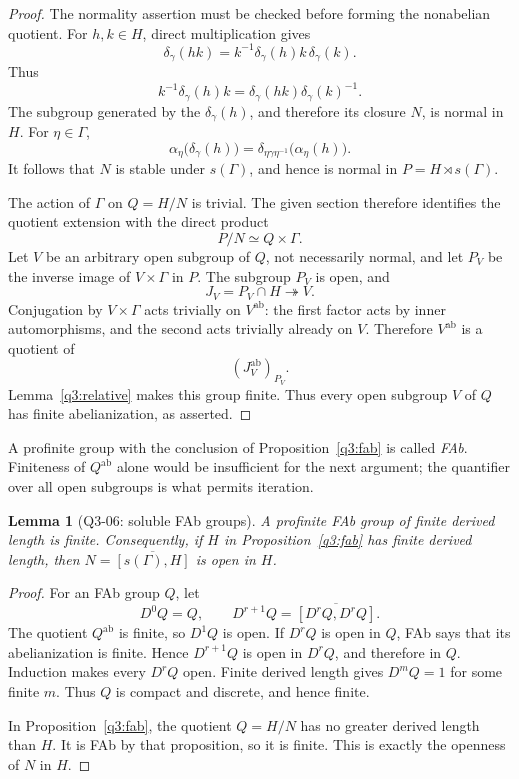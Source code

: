\documentclass[11pt,a4paper]{article}
\newtheorem{lemma}[theorem]{Lemma}
\theoremstyle{remark}
\begin{document}
\begin{proof}
The normality assertion must be checked before forming the
nonabelian quotient.  For \(h,k\in H\), direct multiplication gives
\[
\delta_\gamma(hk)
=k^{-1}\delta_\gamma(h)k\,\delta_\gamma(k).
\]
Thus
\[
k^{-1}\delta_\gamma(h)k
=\delta_\gamma(hk)\delta_\gamma(k)^{-1}.
\]
The subgroup generated by the \(\delta_\gamma(h)\), and therefore
its closure \(N\), is normal in \(H\).  For \(\eta\in\Gamma\),
\[
\alpha_\eta\bigl(\delta_\gamma(h)\bigr)
=\delta_{\eta\gamma\eta^{-1}}\bigl(\alpha_\eta(h)\bigr).
\]
It follows that \(N\) is stable under \(s(\Gamma)\), and hence is
normal in \(P=H\rtimes s(\Gamma)\).

The action of \(\Gamma\) on \(Q=H/N\) is trivial.  The given section
therefore identifies the quotient extension with the direct product
\[
P/N\simeq Q\times\Gamma.
\]
Let \(V\) be an arbitrary open subgroup of \(Q\), not necessarily
normal, and let \(P_V\) be the inverse image of \(V\times\Gamma\)
in \(P\).  The subgroup \(P_V\) is open, and
\[
J_V=P_V\cap H\twoheadrightarrow V.
\]
Conjugation by \(V\times\Gamma\) acts trivially on
\(V^{\mathrm{ab}}\): the first factor acts by inner automorphisms,
and the second acts trivially already on \(V\).  Therefore
\(V^{\mathrm{ab}}\) is a quotient of
\[
(J_V^{\mathrm{ab}})_{P_V}.
\]
Lemma~\ref{q3:relative} makes this group finite.  Thus every open
subgroup \(V\) of \(Q\) has finite abelianization, as asserted.
\end{proof}

A profinite group with the conclusion of
Proposition~\ref{q3:fab} is called \emph{FAb}.  Finiteness of
\(Q^{\mathrm{ab}}\) alone would be insufficient for the next
argument; the quantifier over all open subgroups is what permits
iteration.

\begin{lemma}[Q3-06: soluble FAb groups]
\label{q3:soluble}
A profinite FAb group of finite derived length is finite.
Consequently, if \(H\) in Proposition~\ref{q3:fab} has finite
derived length, then \(N=\overline{[s(\Gamma),H]}\) is open in \(H\).
\end{lemma}

\begin{proof}
For an FAb group \(Q\), let
\[
D^0Q=Q,\qquad
D^{r+1}Q=\overline{[D^rQ,D^rQ]}.
\]
The quotient \(Q^{\mathrm{ab}}\) is finite, so \(D^1Q\) is open.
If \(D^rQ\) is open in \(Q\), FAb says that its abelianization is
finite.  Hence \(D^{r+1}Q\) is open in \(D^rQ\), and therefore in
\(Q\).  Induction makes every \(D^rQ\) open.  Finite derived length
gives \(D^mQ=1\) for some finite \(m\).  Thus \(Q\) is compact and
discrete, and hence finite.

In Proposition~\ref{q3:fab}, the quotient \(Q=H/N\) has no greater
derived length than \(H\).  It is FAb by that proposition, so it is
finite.  This is exactly the openness of \(N\) in \(H\).
\end{proof}
\end{document}
